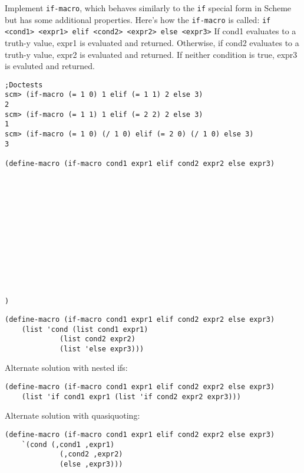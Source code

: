 \begin{blocksection}

\question Implement \texttt{if-macro}, which behaves similarly to the \texttt{if} special form in Scheme
but has some additional properties. Here's how the \texttt{if-macro} is called:
\newline
\texttt{if <cond1> <expr1> elif <cond2> <expr2> else <expr3>}
\newline
If cond1 evaluates to a truth-y value, expr1 is evaluated and returned. Otherwise, if cond2 evaluates
to a truth-y value, expr2 is evaluated and returned. If neither condition is true, expr3 is evaluted and returned.

\begin{lstlisting}
;Doctests
scm> (if-macro (= 1 0) 1 elif (= 1 1) 2 else 3)
2
scm> (if-macro (= 1 1) 1 elif (= 2 2) 2 else 3)
1
scm> (if-macro (= 1 0) (/ 1 0) elif (= 2 0) (/ 1 0) else 3)
3

(define-macro (if-macro cond1 expr1 elif cond2 expr2 else expr3)













)
\end{lstlisting}
\end{blocksection}
\begin{blocksection}
\begin{solution}[0.5in]
\begin{lstlisting}
(define-macro (if-macro cond1 expr1 elif cond2 expr2 else expr3)
    (list 'cond (list cond1 expr1)
             (list cond2 expr2)
             (list 'else expr3)))
\end{lstlisting}
Alternate solution with nested ifs:
\begin{lstlisting}
(define-macro (if-macro cond1 expr1 elif cond2 expr2 else expr3)
    (list 'if cond1 expr1 (list 'if cond2 expr2 expr3)))
\end{lstlisting}
Alternate solution with quasiquoting:
\begin{lstlisting}
(define-macro (if-macro cond1 expr1 elif cond2 expr2 else expr3)
    `(cond (,cond1 ,expr1)
             (,cond2 ,expr2)
             (else ,expr3)))
\end{lstlisting}
\end{solution}
\end{blocksection}

